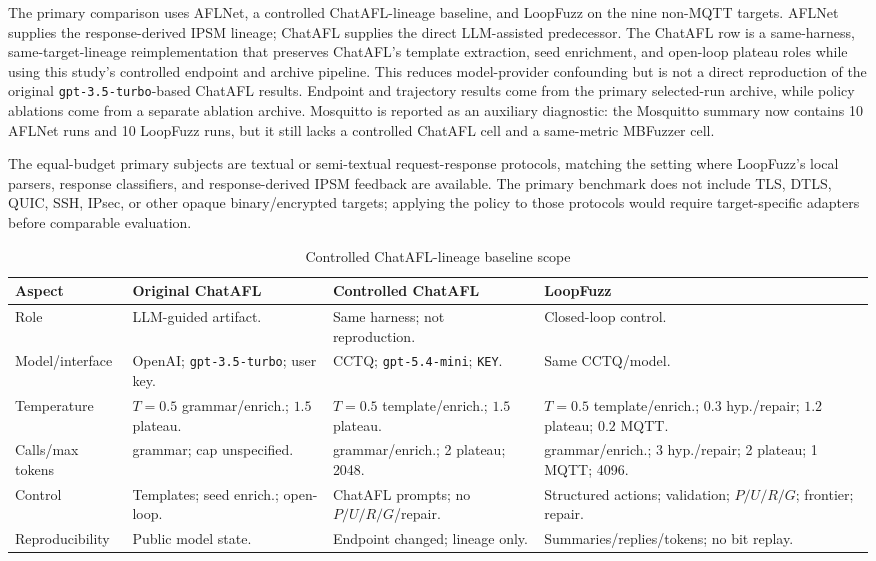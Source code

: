 \documentclass[final,5p,times,number]{elsarticle}
\begin{document}
The primary comparison uses AFLNet, a controlled ChatAFL-lineage baseline, and LoopFuzz on the nine non-MQTT targets. AFLNet supplies the response-derived IPSM lineage; ChatAFL supplies the direct LLM-assisted predecessor. The ChatAFL row is a same-harness, same-target-lineage reimplementation that preserves ChatAFL's template extraction, seed enrichment, and open-loop plateau roles while using this study's controlled endpoint and archive pipeline. This reduces model-provider confounding but is not a direct reproduction of the original \texttt{gpt-3.5-turbo}-based ChatAFL results. Endpoint and trajectory results come from the primary selected-run archive, while policy ablations come from a separate ablation archive. Mosquitto is reported as an auxiliary diagnostic: the Mosquitto summary now contains 10 AFLNet runs and 10 LoopFuzz runs, but it still lacks a controlled ChatAFL cell and a same-metric MBFuzzer cell.

The equal-budget primary subjects are textual or semi-textual request-response protocols, matching the setting where LoopFuzz's local parsers, response classifiers, and response-derived IPSM feedback are available. The primary benchmark does not include TLS, DTLS, QUIC, SSH, IPsec, or other opaque binary/encrypted targets; applying the policy to those protocols would require target-specific adapters before comparable evaluation.

\begin{table}[!t]
\centering
\caption{Controlled ChatAFL-lineage baseline scope}
\label{tab:chatafl_config_scope}
{\scriptsize
\setlength{\tabcolsep}{3.0pt}
\renewcommand{\arraystretch}{1.12}
\begin{tabularx}{\textwidth}{>{\raggedright\arraybackslash}p{}
>{\raggedright\arraybackslash}X
>{\raggedright\arraybackslash}X
>{\raggedright\arraybackslash}X}
\toprule
Aspect & Original ChatAFL & Controlled ChatAFL & LoopFuzz \\
\midrule
Role &
LLM-guided artifact. &
Same harness; not reproduction. &
Closed-loop control. \\
Model/interface &
OpenAI; \texttt{gpt-3.5-turbo}; user key. &
CCTQ; \texttt{gpt-5.4-mini}; \texttt{KEY}. &
Same CCTQ/model. \\
Temperature &
$T{=}0.5$ grammar/enrich.; $1.5$ plateau. &
$T{=}0.5$ template/enrich.; $1.5$ plateau. &
$T{=}0.5$ template/enrich.; $0.3$ hyp./repair; $1.2$ plateau; $0.2$ MQTT. \\
Calls/max tokens &
5 grammar; cap unspecified. &
5 grammar/enrich.; 2 plateau; 2048. &
5 grammar/enrich.; 3 hyp./repair; 2 plateau; 1 MQTT; 4096. \\
Control &
Templates; seed enrich.; open-loop. &
ChatAFL prompts; no $P/U/R/G$/repair. &
Structured actions; validation; $P/U/R/G$; frontier; repair. \\
Reproducibility &
Public model state. &
Endpoint changed; lineage only. &
Summaries/replies/tokens; no bit replay. \\
\bottomrule
\end{tabularx}
}
\end{table}
\end{document}
